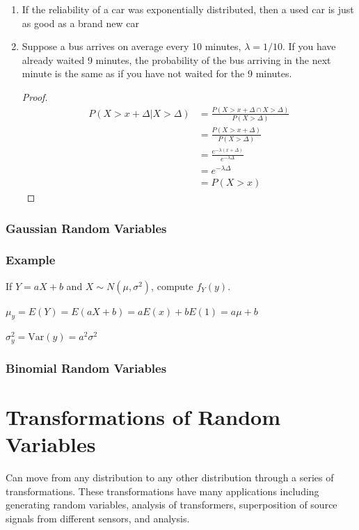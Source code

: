 \documentclass{report}
\newcommand{\var}{\sigma^2}
\newcommand{\Var}{\text{Var}}
\begin{document}
\begin{enumerate}
\item If the reliability of a car was exponentially distributed, then a used car is just as good as a brand new car
\item Suppose a bus arrives on average every 10 minutes, $\lambda=1/10$. If you have  already waited 9 minutes, the probability of the bus arriving in the next minute is the same as if you have not waited for the 9 minutes.
\begin{proof}
\begin{align*}
P(X > x + \Delta | X > \Delta) & = \frac{P(X > x + \Delta \cap X > \Delta)}{P(X > \Delta)} \\
& = \frac{P(X >  x + \Delta)}{P(X > \Delta)} \\
& = \frac{e^{-\lambda(x+\Delta)}}{e^{-\lambda \Delta}} \\
& = e^{-\lambda \Delta}  \\
& = P(X > x) \end{align*} \end{proof}
\end{enumerate}



\subsubsection{Gaussian Random Variables}

\subsubsection*{Example}
If $Y = aX + b$ and $X \sim N(\mu, \var)$, compute $f_Y(y)$.

$\mu_y = E(Y) = E(aX + b) = aE(x) + bE(1) = a\mu + b$

$\var_y = \Var(y) = a^2 \var$

\subsubsection{Binomial Random Variables}



\section{Transformations of Random Variables}

Can move from any distribution to any other distribution through a series of transformations. These transformations have many applications including generating random variables, analysis of transformers, superposition of source signals from different sensors, and analysis.
\end{document}

